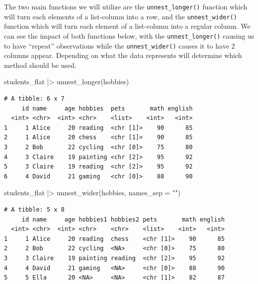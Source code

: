 \documentclass[
  letterpaper,
  DIV=11,
  numbers=noendperiod]{scrreprt}
\newenvironment{Shaded}{\begin{snugshade}}{\end{snugshade}}
\newcommand{\AttributeTok}[1]{\textcolor[rgb]{0.40,0.45,0.13}{#1}}
\newcommand{\FunctionTok}[1]{\textcolor[rgb]{0.28,0.35,0.67}{#1}}
\newcommand{\NormalTok}[1]{\textcolor[rgb]{0.00,0.23,0.31}{#1}}
\newcommand{\SpecialCharTok}[1]{\textcolor[rgb]{0.37,0.37,0.37}{#1}}
\newcommand{\StringTok}[1]{\textcolor[rgb]{0.13,0.47,0.30}{#1}}
\begin{document}
The two main functions we will utilize are the \texttt{unnest\_longer()}
function which will turn each elements of a list-column into a row, and
the \texttt{unnest\_wider()} function which will turn each element of a
list-column into a regular column. We can see the impact of both
functions below, with the \texttt{unnest\_longer()} causing us to have
``repeat'' observations while the \texttt{unnest\_wider()} causes it to
have 2 columns appear. Depending on what the data represents will
determine which method should be used.

\begin{Shaded}
\begin{Highlighting}[]
\NormalTok{students\_flat }\SpecialCharTok{|\textgreater{}} \FunctionTok{unnest\_longer}\NormalTok{(hobbies)}
\end{Highlighting}
\end{Shaded}

\begin{verbatim}
# A tibble: 6 x 7
     id name     age hobbies  pets       math english
  <int> <chr>  <int> <chr>    <list>    <int>   <int>
1     1 Alice     20 reading  <chr [1]>    90      85
2     1 Alice     20 chess    <chr [1]>    90      85
3     2 Bob       22 cycling  <chr [0]>    75      80
4     3 Claire    19 painting <chr [2]>    95      92
5     3 Claire    19 reading  <chr [2]>    95      92
6     4 David     21 gaming   <chr [0]>    88      90
\end{verbatim}

\begin{Shaded}
\begin{Highlighting}[]
\NormalTok{students\_flat }\SpecialCharTok{|\textgreater{}} \FunctionTok{unnest\_wider}\NormalTok{(hobbies, }\AttributeTok{names\_sep =} \StringTok{""}\NormalTok{)}
\end{Highlighting}
\end{Shaded}

\begin{verbatim}
# A tibble: 5 x 8
     id name     age hobbies1 hobbies2 pets       math english
  <int> <chr>  <int> <chr>    <chr>    <list>    <int>   <int>
1     1 Alice     20 reading  chess    <chr [1]>    90      85
2     2 Bob       22 cycling  <NA>     <chr [0]>    75      80
3     3 Claire    19 painting reading  <chr [2]>    95      92
4     4 David     21 gaming   <NA>     <chr [0]>    88      90
5     5 Ella      20 <NA>     <NA>     <chr [1]>    82      87
\end{verbatim}
\end{document}
